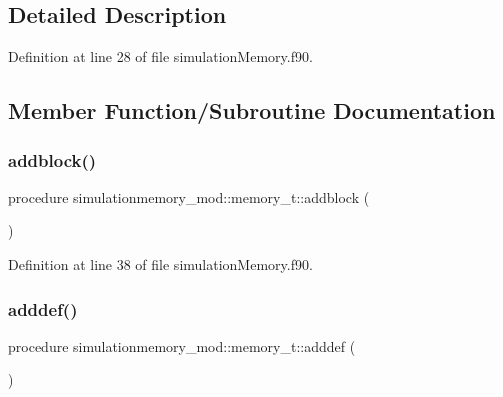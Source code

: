 \subsection{Detailed Description}


Definition at line 28 of file simulation\+Memory.\+f90.



\subsection{Member Function/\+Subroutine Documentation}
\mbox{\label{structsimulationmemory__mod_1_1memory__t_af4369c1b67450c093ccfb2837e709c3c}} 
\subsubsection{\texorpdfstring{addblock()}{addblock()}}
{\footnotesize\ttfamily procedure simulationmemory\+\_\+mod\+::memory\+\_\+t\+::addblock (\begin{DoxyParamCaption}{ }\end{DoxyParamCaption})\hspace{0.3cm}{\ttfamily [private]}}



Definition at line 38 of file simulation\+Memory.\+f90.

\mbox{\label{structsimulationmemory__mod_1_1memory__t_a9024c06137d2b62198dc8c29a97d18a3}} 
\subsubsection{\texorpdfstring{adddef()}{adddef()}}
{\footnotesize\ttfamily procedure simulationmemory\+\_\+mod\+::memory\+\_\+t\+::adddef (\begin{DoxyParamCaption}{ }\end{DoxyParamCaption})\hspace{0.3cm}{\ttfamily [private]}}



